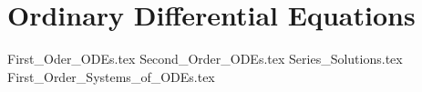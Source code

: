 \section{Ordinary Differential Equations}

{First_Oder_ODEs.tex}
{Second_Order_ODEs.tex}
{Series_Solutions.tex}
{First_Order_Systems_of_ODEs.tex}